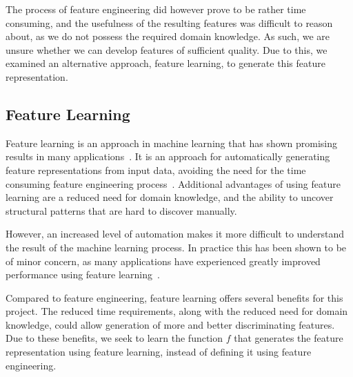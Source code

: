The process of feature engineering did however prove to be rather time consuming, and the usefulness of the resulting features was difficult to reason about, as we do not possess the required domain knowledge. As such, we are unsure whether we can develop features of sufficient quality. Due to this, we examined an alternative approach, feature learning, to generate this feature representation.

\subsection{Feature Learning}
Feature learning is an approach in machine learning that has shown promising results in many applications~\cite{bengio2013representation}. It is an approach for automatically generating feature representations from input data, avoiding the need for the time consuming feature engineering process~\cite{ng-lecture}. Additional advantages of using feature learning are a reduced need for domain knowledge, and the ability to uncover structural patterns that are hard to discover manually.

However, an increased level of automation makes it more difficult to understand the result of the machine learning process. In practice this has been shown to be of minor concern, as many applications have experienced greatly improved performance using feature learning~\cite{bengio2013representation}.


Compared to feature engineering, feature learning offers several benefits for this project. The reduced time requirements, along with the reduced need for domain knowledge, could allow generation of more and better discriminating features. Due to these benefits, we seek to learn the function $f$ that generates the feature representation using feature learning, instead of defining it using feature engineering.
